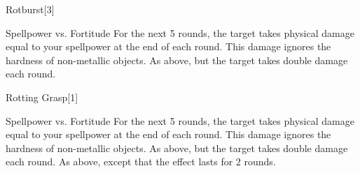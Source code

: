 \begin{spellsection}{Rotburst}[3]
    \begin{spellheader}
    \end{spellheader}
    \begin{spellcontent}
        \begin{spelltargetinginfo}
        \end{spelltargetinginfo}
        \begin{spelleffects}
            \begin{spellattack}{Spellpower vs. Fortitude}
                \spellsuccess For the next 5 rounds, the target takes physical damage equal to your spellpower at the end of each round. This damage ignores the hardness of non-metallic objects.
                \spellcritical As above, but the target takes double damage each round.
            \end{spellattack}
        \end{spelleffects}
    \end{spellcontent}
    \begin{spellfooter}
        \miscastexplode
    \end{spellfooter}
    \begin{spellaugments}
    \end{spellaugments}
\end{spellsection}

\begin{spellsection}{Rotting Grasp}[1]
    \begin{spellheader}
    \end{spellheader}
    \begin{spellcontent}
        \begin{spelltargetinginfo}
        \end{spelltargetinginfo}
        \begin{spelleffects}
            \begin{spellattack}{Spellpower vs. Fortitude}
                \spellsuccess For the next 5 rounds, the target takes physical damage equal to your spellpower at the end of each round. This damage ignores the hardness of non-metallic objects.
                \spellcritical As above, but the target takes double damage each round.
                \spellfailure As above, except that the effect lasts for 2 rounds.
            \end{spellattack}
        \end{spelleffects}
    \end{spellcontent}
    \begin{spellfooter}
        \miscastexplode
    \end{spellfooter}
\end{spellsection}

